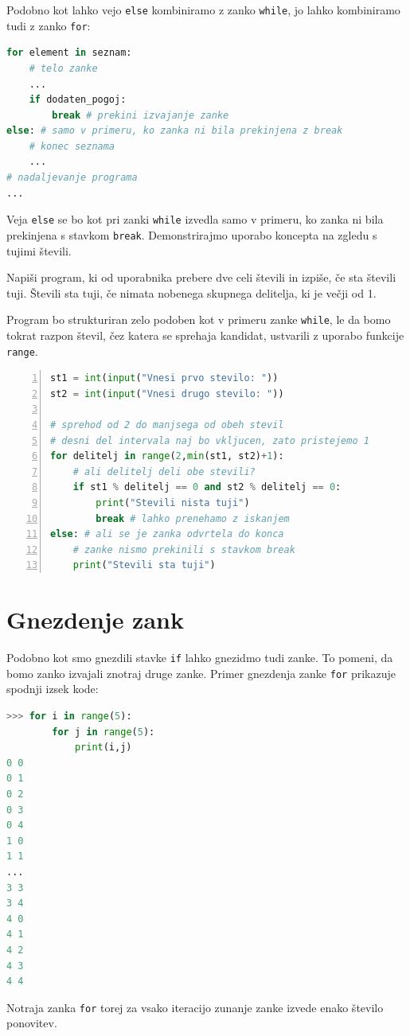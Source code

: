 Podobno kot lahko vejo \texttt{else} kombiniramo z zanko \texttt{while}, jo lahko kombiniramo tudi z zanko \texttt{for}:
\begin{lstlisting}[language=Python]
for element in seznam:
    # telo zanke
    ...
    if dodaten_pogoj:
        break # prekini izvajanje zanke
else: # samo v primeru, ko zanka ni bila prekinjena z break
    # konec seznama
    ...
# nadaljevanje programa
...
\end{lstlisting}

Veja \texttt{else} se bo kot pri zanki \texttt{while} izvedla samo v primeru, ko zanka ni bila prekinjena s stavkom \texttt{break}. Demonstrirajmo uporabo koncepta na zgledu s tujimi števili.

\begin{zgled}
Napiši program, ki od uporabnika prebere dve celi števili in izpiše, če sta števili tuji. Števili sta tuji, če nimata nobenega skupnega delitelja, ki je večji od 1.
\end{zgled}
\begin{resitev}
Program bo strukturiran zelo podoben kot v primeru zanke \texttt{while}, le da bomo tokrat razpon števil, čez katera se sprehaja kandidat, ustvarili z uporabo funkcije \texttt{range}. 

\begin{lstlisting}[language=Python,numbers=left]
st1 = int(input("Vnesi prvo stevilo: "))
st2 = int(input("Vnesi drugo stevilo: "))

# sprehod od 2 do manjsega od obeh stevil
# desni del intervala naj bo vkljucen, zato pristejemo 1
for delitelj in range(2,min(st1, st2)+1):
    # ali delitelj deli obe stevili?
    if st1 % delitelj == 0 and st2 % delitelj == 0:
        print("Stevili nista tuji")
        break # lahko prenehamo z iskanjem
else: # ali se je zanka odvrtela do konca
    # zanke nismo prekinili s stavkom break
    print("Stevili sta tuji")
\end{lstlisting}
\end{resitev}


\section{Gnezdenje zank}

Podobno kot smo gnezdili stavke \texttt{if} lahko gnezidmo tudi zanke. To pomeni, da bomo zanko izvajali znotraj druge zanke. Primer gnezdenja zanke \texttt{for} prikazuje spodnji izsek kode:
\begin{lstlisting}[language=Python]
>>> for i in range(5):
        for j in range(5):
            print(i,j)
0 0
0 1
0 2
0 3
0 4
1 0
1 1
...
3 3
3 4
4 0
4 1
4 2
4 3
4 4
\end{lstlisting}
Notraja zanka \texttt{for} torej za vsako iteracijo zunanje zanke izvede enako število ponovitev.

